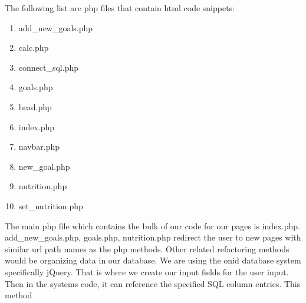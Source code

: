 \documentclass[a4paper]{article}
\begin{document}
\newline
\newline
The following list are php files that contain html code snippets:
\begin{enumerate}
\item add\_new\_goals.php
\item calc.php
\item connect\_sql.php
\item goals.php
\item head.php
\item index.php
\item navbar.php
\item new\_goal.php
\item nutrition.php
\item set\_nutrition.php
\end{enumerate}

\noindent The main php file which contains the bulk of our code for our pages is index.php. add\_new\_goals.php, goals.php, nutrition.php redirect the user to new pages with similar url path names as the php methods. Other related refactoring methods would be organizing data in our database. We are using the onid database system specifically jQuery. That is where we create our input fields for the user input. Then in the systems code, it can reference the specified SQL column entries. This method 
\end{document}
